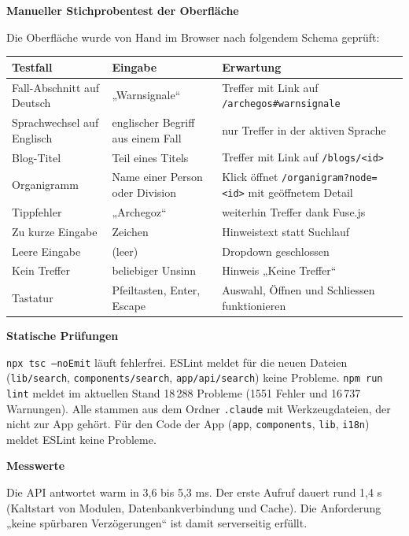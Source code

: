 \documentclass[11pt,a4paper]{article}
\newcommand{\minihead}[1]{\par\needspace{5\baselineskip}\noindent\textbf{#1}\par\nobreak}
\begin{document}
\minihead{Manueller Stichprobentest der Oberfläche}
Die Oberfläche wurde von Hand im Browser nach folgendem Schema geprüft:
\begin{center}
\small
\begin{longtable}{@{}>{\raggedright\arraybackslash}p{5.2cm} >{\raggedright\arraybackslash}p{4.6cm} >{\raggedright\arraybackslash}p{5.2cm}@{}}
\toprule
\textbf{Testfall} & \textbf{Eingabe} & \textbf{Erwartung} \\
\midrule
\endhead
Fall-Abschnitt auf Deutsch & „Warnsignale“ & Treffer mit Link auf \texttt{/archegos\#warnsignale} \\
\midrule
Sprachwechsel auf Englisch & englischer Begriff aus einem Fall & nur Treffer in der aktiven Sprache \\
\midrule
Blog-Titel & Teil eines Titels & Treffer mit Link auf \texttt{/blogs/<id>} \\
\midrule
Organigramm & Name einer Person oder Division & Klick öffnet \texttt{/organigram?node=<id>} mit geöffnetem Detail \\
\midrule
Tippfehler & „Archegoz“ & weiterhin Treffer dank Fuse.js \\
\midrule
Zu kurze Eingabe & 1 Zeichen & Hinweistext statt Suchlauf \\
\midrule
Leere Eingabe & (leer) & Dropdown geschlossen \\
\midrule
Kein Treffer & beliebiger Unsinn & Hinweis „Keine Treffer“ \\
\midrule
Tastatur & Pfeiltasten, Enter, Escape & Auswahl, Öffnen und Schliessen funktionieren \\
\bottomrule
\end{longtable}
\end{center}

\minihead{Statische Prüfungen}
\texttt{npx tsc --noEmit} läuft fehlerfrei. ESLint meldet für die neuen Dateien (\texttt{lib/search}, \texttt{components/search}, \texttt{app/api/search}) keine Probleme. \texttt{npm run lint} meldet im aktuellen Stand 18\,288 Probleme (1551 Fehler und 16\,737 Warnungen). Alle stammen aus dem Ordner \texttt{.claude} mit Werkzeugdateien, der nicht zur App gehört. Für den Code der App (\texttt{app}, \texttt{components}, \texttt{lib}, \texttt{i18n}) meldet ESLint keine Probleme.

\minihead{Messwerte}
Die API antwortet warm in 3,6 bis 5,3 ms. Der erste Aufruf dauert rund 1,4 s (Kaltstart von Modulen, Datenbankverbindung und Cache). Die Anforderung „keine spürbaren Verzögerungen“ ist damit serverseitig erfüllt.
\end{document}
